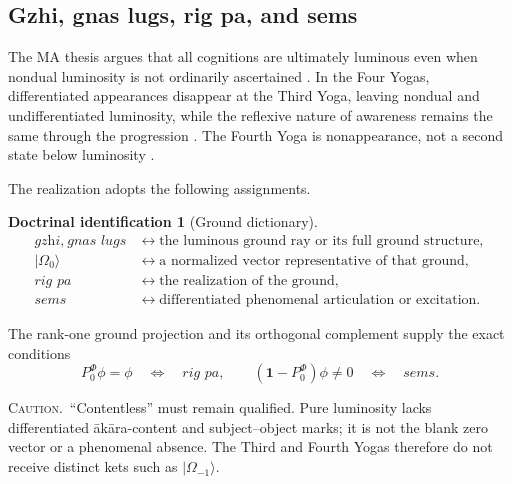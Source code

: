 \documentclass[11pt,reqno]{scrartcl}
\newcommand{\PzeroF}{P_{0}^{\Phi}}
\newcommand{\idop}{\mathbf 1}
\newcommand{\ket}[1]{\lvert #1\rangle}
\newcommand{\warninglabel}{\par\smallskip\noindent\textsc{Caution.}\ }
\theoremstyle{plain}
\theoremstyle{definition}
\newtheorem{identification}[identification]{Doctrinal identification}
\theoremstyle{remark}
\begin{document}
\subsection{Gzhi, gnas lugs, rig pa, and sems}

The MA thesis argues that all cognitions are ultimately luminous even when
nondual luminosity is not ordinarily ascertained
\cite[pp.~162--163]{Yiannopoulos2012}.  In the Four Yogas, differentiated
appearances disappear at the Third Yoga, leaving nondual and undifferentiated
luminosity, while the reflexive nature of awareness remains the same through
the progression \cite[pp.~182--183]{Yiannopoulos2012}.  The Fourth Yoga is
nonappearance, not a second state below luminosity
\cite[pp.~184--185]{Yiannopoulos2012}.

The realization adopts the following assignments.

\begin{identification}[Ground dictionary]
\label{id:ground-dictionary}
\begin{align}
  \textit{gzhi},\ \textit{gnas lugs}
  &\longleftrightarrow
  \text{the luminous ground ray or its full ground structure},
  \label{eq:gzhi-map}\\
  \ket{\Omega_0}
  &\longleftrightarrow
  \text{a normalized vector representative of that ground},
  \label{eq:Omega0-map}\\
  \textit{rig pa}
  &\longleftrightarrow
  \text{the realization of the ground},
  \label{eq:rigpa-map}\\
  \textit{sems}
  &\longleftrightarrow
  \text{differentiated phenomenal articulation or excitation}.
  \label{eq:sems-map}
\end{align}
\end{identification}

The rank-one ground projection and its orthogonal complement supply the exact
conditions
\begin{equation}
  \PzeroF\phi=\phi
  \quad\Longleftrightarrow\quad
  \textit{rig pa},
  \qquad
  (\idop-\PzeroF)\phi\neq0
  \quad\Longleftrightarrow\quad
  \textit{sems}.
  \label{eq:rigpa-sems-preview}
\end{equation}

\warninglabel ``Contentless'' must remain qualified.  Pure luminosity lacks
differentiated \=ak\=ara-content and subject--object marks; it is not the blank
zero vector or a phenomenal absence.  The Third and Fourth Yogas therefore do
not receive distinct kets such as \(\ket{\Omega_{-1}}\).
\end{document}
